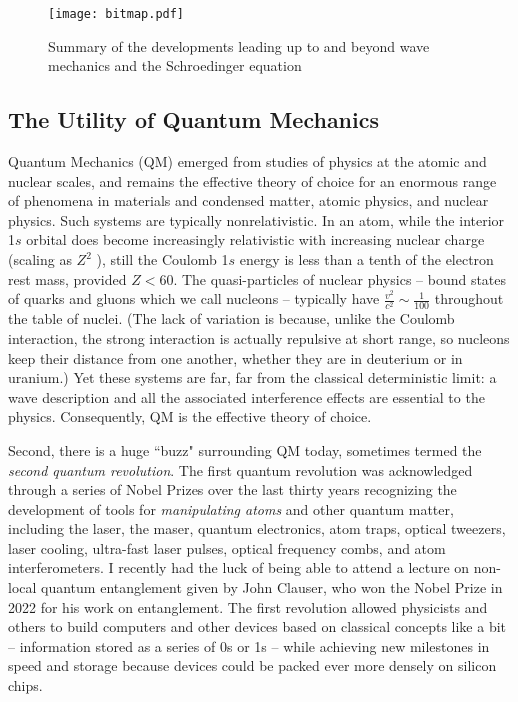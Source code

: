 \begin{figure}[htp]
  \centering
    \texttt{[image: bitmap.pdf]}
    \caption{Summary of the developments leading up to and beyond wave
    mechanics and the Schroedinger equation}
\end{figure}

\subsection{The Utility of Quantum Mechanics}

Quantum Mechanics (QM) emerged from studies of physics at the atomic and
nuclear scales, and remains the effective theory of choice for an enormous
range of phenomena in materials and condensed matter, atomic physics, and
nuclear physics. Such systems are typically nonrelativistic. In an atom, while
the interior 1$s$ orbital does become increasingly relativistic with increasing
nuclear charge (scaling as $Z^2$ ), still the Coulomb 1$s$ energy is less than
a tenth of the electron rest mass, provided $Z < 60$. The quasi-particles of
nuclear physics -- bound states of quarks and gluons which we call nucleons --
typically have $\frac{v^2}{c^2} \sim \frac{1}{100}$ throughout the table of
nuclei. (The lack of variation is because, unlike the Coulomb interaction, the
strong interaction is actually repulsive at short range, so nucleons keep their
distance from one another, whether they are in deuterium or in uranium.) Yet
these systems are far, far from the classical deterministic limit: a wave
description and all the associated interference effects are essential to the
physics. Consequently, QM is the effective theory of choice. 

Second, there is a huge ``buzz" surrounding QM today, sometimes termed the
\textit{second quantum revolution}. The first quantum revolution was
acknowledged through a series of Nobel Prizes over the last thirty years
recognizing the development of tools for \textit{manipulating atoms} and other
quantum matter, including the laser, the maser, quantum electronics, atom
traps, optical tweezers, laser cooling, ultra-fast laser pulses, optical
frequency combs, and atom interferometers. I recently had the luck of being
able to attend a lecture on non-local quantum entanglement given by John
Clauser, who won the Nobel Prize in 2022 for his work on entanglement. The
first revolution allowed physicists and others to build computers and other
devices based on classical concepts like a bit -- information stored as
a series of 0s or 1s -- while achieving new milestones in speed and storage
because devices could be packed ever more densely on silicon chips. 

